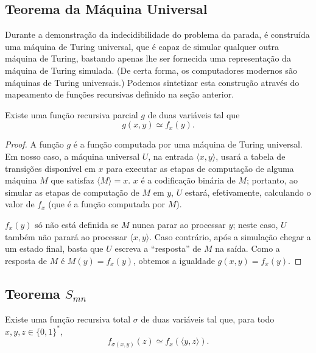 \subsection{Teorema da Máquina Universal}
\label{sec:universal_turing_machine}

Durante a demonstração da indecidibilidade do problema da parada,
é construída uma máquina de Turing universal,
que é capaz de simular qualquer outra máquina de Turing,
bastando apenas lhe ser fornecida uma representação da máquina de Turing simulada.
(De certa forma,
os computadores modernos são máquinas de Turing universais.)
Podemos sintetizar esta construção através do mapeamento de funções recursivas
definido na seção anterior.

\begin{theorem}
    Existe uma função recursiva parcial $g$ de duas variáveis tal que
    \begin{equation*}
        g(x, y) \simeq f_x(y).
    \end{equation*}
\end{theorem}

\begin{proof}
    A função $g$ é a função computada por uma máquina de Turing universal.
    Em nosso caso,
    a máquina universal $U$,
    na entrada $\langle x, y \rangle$,
    usará a tabela de transições disponível em $x$
    para executar as etapas de computação de alguma máquina $M$
    que satisfaz $\langle M \rangle = x$.
    $x$ é a codificação binária de $M$;
    portanto,
    ao simular as etapas de computação de $M$ em $y$,
    $U$ estará, efetivamente,
    calculando o valor de $f_x$ (que é a função computada por $M$).

    $f_x(y)$ só não está definida se $M$ nunca parar ao processar $y$;
    neste caso, $U$ também não parará ao processar $\langle x, y \rangle$.
    Caso contrário,
    após a simulação chegar a um estado final,
    basta que $U$ escreva a ``resposta'' de $M$ na saída.
    Como a resposta de $M$ é $M(y) = f_x(y)$,
    obtemos a igualdade $g(x, y) = f_x(y)$.
\end{proof}

\subsection{Teorema $S_{mn}$}
\label{sec:s_m_n_theorem}

\begin{theorem}
    Existe uma função recursiva total $\sigma$ de duas variáveis tal que,
    para todo $x, y, z \in \{0, 1\}^*$,
    \begin{equation*}
        f_{\sigma(x, y)}(z) \simeq f_x(\langle y, z \rangle).
    \end{equation*}
\end{theorem}

